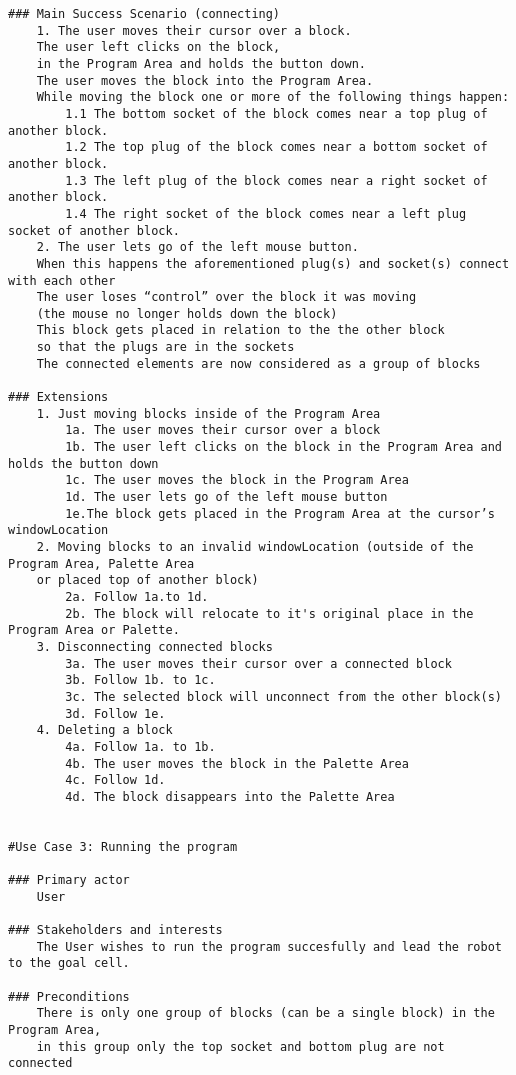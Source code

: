 \documentclass{article}
\begin{document}
\begin{verbatim}
### Main Success Scenario (connecting)
    1. The user moves their cursor over a block. 
    The user left clicks on the block, 
    in the Program Area and holds the button down. 
    The user moves the block into the Program Area.
    While moving the block one or more of the following things happen:
        1.1 The bottom socket of the block comes near a top plug of another block. 
        1.2 The top plug of the block comes near a bottom socket of another block.
        1.3 The left plug of the block comes near a right socket of another block.
        1.4 The right socket of the block comes near a left plug socket of another block. 
    2. The user lets go of the left mouse button. 
    When this happens the aforementioned plug(s) and socket(s) connect with each other
    The user loses “control” over the block it was moving
    (the mouse no longer holds down the block)
    This block gets placed in relation to the the other block 
    so that the plugs are in the sockets
    The connected elements are now considered as a group of blocks

### Extensions
    1. Just moving blocks inside of the Program Area
        1a. The user moves their cursor over a block
        1b. The user left clicks on the block in the Program Area and holds the button down
        1c. The user moves the block in the Program Area
        1d. The user lets go of the left mouse button 
        1e.The block gets placed in the Program Area at the cursor’s windowLocation
    2. Moving blocks to an invalid windowLocation (outside of the Program Area, Palette Area
    or placed top of another block)
        2a. Follow 1a.to 1d.
        2b. The block will relocate to it's original place in the Program Area or Palette.
    3. Disconnecting connected blocks
        3a. The user moves their cursor over a connected block
        3b. Follow 1b. to 1c.
        3c. The selected block will unconnect from the other block(s)
        3d. Follow 1e.
    4. Deleting a block
        4a. Follow 1a. to 1b.
        4b. The user moves the block in the Palette Area
        4c. Follow 1d.
        4d. The block disappears into the Palette Area
  
    
#Use Case 3: Running the program

### Primary actor
    User
    
### Stakeholders and interests
    The User wishes to run the program succesfully and lead the robot to the goal cell.

### Preconditions
    There is only one group of blocks (can be a single block) in the Program Area, 
    in this group only the top socket and bottom plug are not connected 


\end{verbatim}
\end{document}
